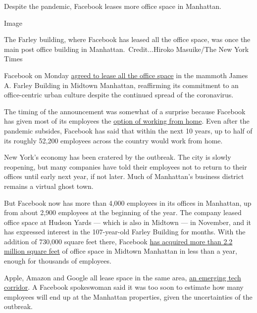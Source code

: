 Despite the pandemic, Facebook leases more office space in Manhattan.

Image

The Farley building, where Facebook has leased all the office space, was
once the main post office building in Manhattan.~Credit...Hiroko
Masuike/The New York Times

Facebook on Monday
\href{https://www.nytimes.com/2020/08/03/nyregion/facebook-nyc-office-farley-building.html}{agreed
to lease all the office space} in the mammoth James A. Farley Building
in Midtown Manhattan, reaffirming its commitment to an office-centric
urban culture despite the continued spread of the coronavirus.

The timing of the announcement was somewhat of a surprise because
Facebook has given most of its employees the
\href{https://www.nytimes.com/2020/05/21/technology/facebook-remote-work-coronavirus.html}{option
of working from home}. Even after the pandemic subsides, Facebook has
said that within the next 10 years, up to half of its roughly 52,200
employees across the country would work from home.

New York's economy has been cratered by the outbreak. The city is slowly
reopening, but many companies have told their employees not to return to
their offices until early next year, if not later. Much of Manhattan's
business district remains a virtual ghost town.

But Facebook now has more than 4,000 employees in its offices in
Manhattan, up from about 2,900 employees at the beginning of the year.
The company leased office space at Hudson Yards --- which is also in
Midtown --- in November, and it has expressed interest in the
107-year-old Farley Building for months. With the addition of 730,000
square feet there, Facebook
\href{https://www.nytimes.com/2020/01/05/nyregion/nyc-tech-facebook-amazon-google.html}{has
acquired more than 2.2 million square feet} of office space in Midtown
Manhattan in less than a year, enough for thousands of employees.

Apple, Amazon and Google all lease space in the same area,
\href{https://www.nytimes.com/2020/01/05/nyregion/nyc-tech-facebook-amazon-google.html}{an
emerging tech corridor}. A Facebook spokeswoman said it was too soon to
estimate how many employees will end up at the Manhattan properties,
given the uncertainties of the outbreak.

\hypertarget{-6}{%
\subsection{}\label{-6}}

